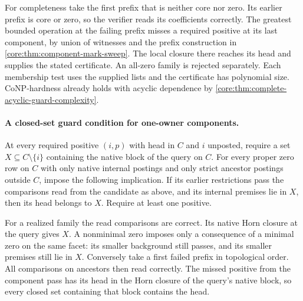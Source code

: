 For completeness take the first prefix that is neither
core nor zero. Its earlier prefix is core or zero, so the
verifier reads its coefficients correctly. The greatest
bounded operation at the failing prefix misses a required
positive at its last component, by union of witnesses
and the prefix construction in
\cref{core:thm:component-mark-sweep}. The local closure
there reaches its head and supplies the stated certificate.
An all-zero family is rejected separately. Each membership
test uses the supplied lists and the certificate has
polynomial size. CoNP-hardness already holds with acyclic
dependence by \cref{core:thm:complete-acyclic-guard-complexity}.

\paragraph{A closed-set guard condition for one-owner components.}
At every required positive $(i,p)$ with head in $C$ and $i$
unposted, require a set $X\subseteq C\setminus\{i\}$ containing
the native block of the query on $C$. For every proper zero row
on $C$ with only native internal postings and only strict
ancestor postings outside $C$, impose the following implication.
If its earlier restrictions pass the comparisons read from the
candidate as above, and its internal premises lie in $X$, then
its head belongs to $X$. Require at least one positive.

For a realized family the read comparisons are correct. Its native
Horn closure at the query gives $X$. A nonminimal zero imposes only
a consequence of a minimal zero on the same facet: its smaller
background still passes, and its smaller premises still lie in $X$.
Conversely take a first failed prefix in topological order.
All comparisons on ancestors then read correctly. The missed
positive from the component pass has its head in the Horn closure
of the query's native block, so every closed set containing that
block contains the head.

